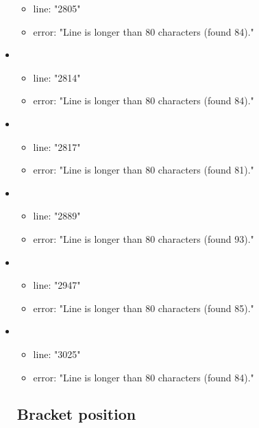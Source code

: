 \begin{itemize}
\begin{itemize}
		\item line: "2805" 
		\item error: "Line is longer than 80 characters (found 84)." 
	\end{itemize}
	\item 
	\begin{itemize} 
		\item line: "2814" 
		\item error: "Line is longer than 80 characters (found 84)." 
	\end{itemize}
	\item 
	\begin{itemize} 
		\item line: "2817" 
		\item error: "Line is longer than 80 characters (found 81)." 
	\end{itemize}
	\item 
	\begin{itemize} 
		\item line: "2889" 
		\item error: "Line is longer than 80 characters (found 93)." 
	\end{itemize}
	\item 
	\begin{itemize} 
		\item line: "2947" 
		\item error: "Line is longer than 80 characters (found 85)." 
	\end{itemize}
	\item 
	\begin{itemize} 
		\item line: "3025" 
		\item error: "Line is longer than 80 characters (found 84)." 
	\end{itemize}
\subsection{Bracket position} %
\label{sub:bracket_position}



\end{itemize}
